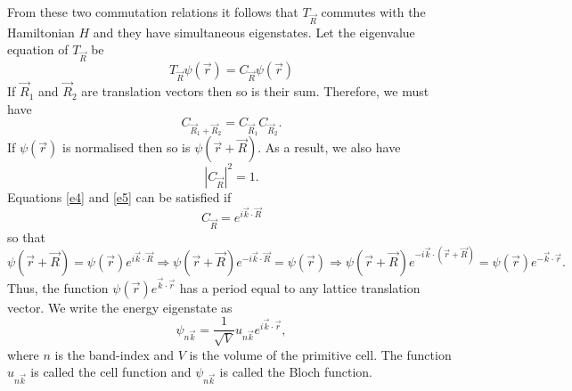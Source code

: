 \documentclass{article}
\begin{document}
From these two commutation relations it follows that $T_{\vec{R}}$ commutes with
the Hamiltonian $H$ and they have simultaneous eigenstates. Let the eigenvalue
equation of $T_{\vec{R}}$ be
\begin{equation}\label{e3}
T_{\vec{R}}\psi(\vec{r}) = C_{\vec{R}}\psi(\vec{r})
\end{equation}
If $\vec{R}_1$ and $\vec{R}_2$ are translation vectors then so is their sum.
Therefore, we must have
\begin{equation}\label{e4}
C_{\vec{R}_1 + \vec{R}_2} = C_{\vec{R}_1}C_{\vec{R}_2}.
\end{equation}
If $\psi(\vec{r})$ is normalised then so is $\psi(\vec{r} + \vec{R})$. As a 
result, we also have
\begin{equation}\label{e5}
|C_{\vec{R}}|^2 = 1.
\end{equation}
Equations \eqref{e4} and \eqref{e5} can be satisfied if
\begin{equation}\label{e6}
C_{\vec{R}} = e^{i\vec{k}\cdot\vec{R}}
\end{equation}
so that
\[
\psi(\vec{r} + \vec{R}) = \psi(\vec{r}) e^{i\vec{k}\cdot\vec{R}} \Rightarrow
\psi(\vec{r} + \vec{R})e^{-i\vec{k}\cdot\vec{R}} = \psi(\vec{r}) \Rightarrow
\psi(\vec{r} + \vec{R})e^{-i\vec{k}\cdot(\vec{r} + \vec{R})} = 
\psi(\vec{r})e^{-\vec{k}\cdot\vec{r}}.
\]
Thus, the function $\psi(\vec{r})e^{\vec{k}\cdot\vec{r}}$ has a period equal to
any lattice translation vector. We write the energy eigenstate as
\begin{equation}\label{e7}
\psi_{n\vec{k}} = \frac{1}{\sqrt{V}}u_{n\vec{k}} e^{i\vec{k}\cdot\vec{r}},
\end{equation}
where $n$ is the band-index and $V$ is the volume of the primitive cell. The
function $u_{n\vec{k}}$ is called the cell function and $\psi_{n\vec{k}}$ is
called the Bloch function.
\end{document}
